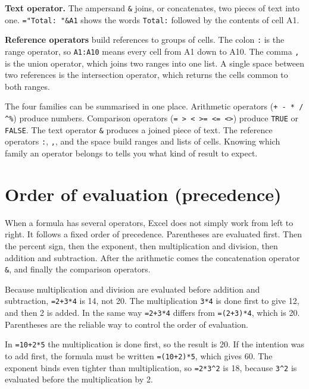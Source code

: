 \textbf{Text operator.} The ampersand \texttt{\&} joins, or concatenates, two
pieces of text into one. \texttt{="Total: "\&A1} shows the words
\texttt{Total:} followed by the contents of cell A1.

\textbf{Reference operators} build references to groups of cells. The colon
\texttt{:} is the range operator, so \texttt{A1:A10} means every cell from A1
down to A10. The comma \texttt{,} is the union operator, which joins two
ranges into one list. A single space between two references is the
intersection operator, which returns the cells common to both ranges.

The four families can be summarised in one place. Arithmetic operators
(\texttt{+ - * / \textasciicircum \%}) produce numbers. Comparison operators
(\texttt{= > < >= <= <>}) produce \texttt{TRUE} or \texttt{FALSE}. The text
operator \texttt{\&} produces a joined piece of text. The reference operators
\texttt{:}, \texttt{,}, and the space build ranges and lists of cells.
Knowing which family an operator belongs to tells you what kind of result to
expect.

\section{Order of evaluation (precedence)}
When a formula has several operators, Excel does not simply work from left to
right. It follows a fixed order of precedence. Parentheses are evaluated
first. Then the percent sign, then the exponent, then multiplication and
division, then addition and subtraction. After the arithmetic comes the
concatenation operator \texttt{\&}, and finally the comparison operators.

Because multiplication and division are evaluated before addition and
subtraction, \texttt{=2+3*4} is 14, not 20. The multiplication \texttt{3*4} is
done first to give 12, and then 2 is added. In the same way
\texttt{=2+3*4} differs from \texttt{=(2+3)*4}, which is 20. Parentheses are
the reliable way to control the order of evaluation.

\begin{example}
In \texttt{=10+2*5} the multiplication is done first, so the result is 20. If
the intention was to add first, the formula must be written
\texttt{=(10+2)*5}, which gives 60. The exponent binds even tighter than
multiplication, so \texttt{=2*3\textasciicircum2} is 18, because
\texttt{3\textasciicircum2} is evaluated before the multiplication by 2.
\end{example}

